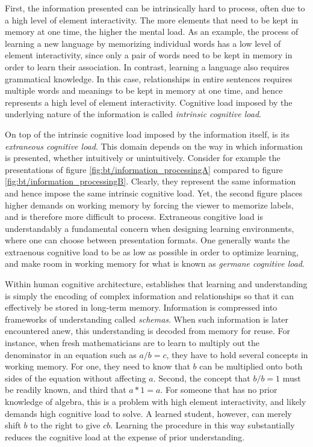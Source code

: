 First, the information presented can be intrinsically hard to process, often due to a high level of element interactivity. The more elements that need to be kept in memory at one time, the higher the mental load. As an example, the process of learning a new language by memorizing individual words has a low level of element interactivity, since only a pair of words need to be kept in memory in order to learn their association. In contrast, learning a language also requires grammatical knowledge. In this case, relationships in entire sentences requires multiple words and meanings to be kept in memory at one time, and hence represents a high level of element interactivity. Cognitive load imposed by the underlying nature of the information is called \textit{intrinsic cognitive load}.

On top of the intrinsic cognitive load imposed by the information itself, is its \textit{extraneous cognitive load}. This domain depends on the way in which information is presented, whether intuitively or unintuitively. Consider for example the presentations of figure \ref{fig:bt/information_processingA} compared to figure \ref{fig:bt/information_processingB}. Clearly, they represent the same information and hence impose the same intrinsic cognitive load. Yet, the second figure places higher demands on working memory by forcing the viewer to memorize labels, and is therefore more difficult to process. Extraneous congitive load is understandably a fundamental concern when designing learning environments, where one can choose between presentation formats. One generally wants the extraenous cognitive load to be as low as possible in order to optimize learning, and make room in working memory for what is known as \textit{germane cognitive load}.

Within human cognitive architecture, \textcite{sweller1988} establishes that learning and understanding is simply the encoding of complex information and relationships so that it can effectively be stored in long-term memory. Information is compressed into frameworks of understanding called \textit{schemas}. When such information is later encountered anew, this understanding is decoded from memory for reuse. For instance, when fresh mathematicians are to learn to multiply out the denominator in an equation such as $a/b=c$, they have to hold several concepts in working memory. For one, they need to know that $b$ can be multiplied onto both sides of the equation without affecting $a$. Second, the concept that $b/b=1$ must be readily known, and third that $a*1=a$. For someone that has no prior knowledge of algebra, this is a problem with high element interactivity, and likely demands high cognitive load to solve. A learned student, however, can merely shift $b$ to the right to give $cb$. Learning the procedure in this way substantially reduces the cognitive load at the expense of prior understanding.

